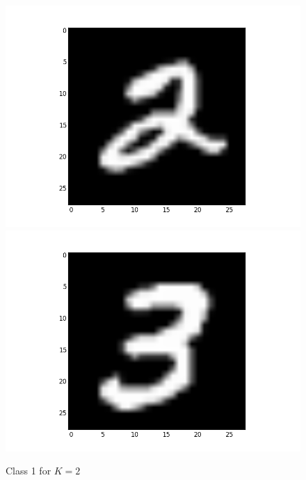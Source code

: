 \documentclass[submit]{harvardml}
\begin{document}
\begin{figure}[ht]
    \includegraphics[scale=0.15]{K2-representative-0-2}
    \includegraphics[scale=0.15]{K2-representative-0-3}
    \caption{Class 1 for $K=2$}
\end{figure}
\end{document}
